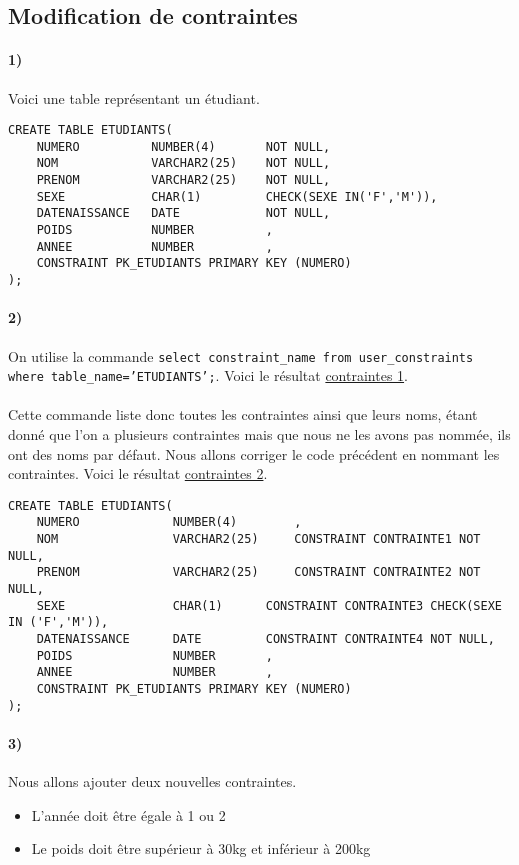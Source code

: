 \documentclass{report}
\begin{document}
\subsection{Modification de contraintes}

\paragraph{1)}Voici une table représentant un étudiant.

\begin{lstlisting}
CREATE TABLE ETUDIANTS(
    NUMERO          NUMBER(4)       NOT NULL,
    NOM             VARCHAR2(25)    NOT NULL,
    PRENOM          VARCHAR2(25)    NOT NULL,
    SEXE            CHAR(1)         CHECK(SEXE IN('F','M')),
    DATENAISSANCE   DATE            NOT NULL,
    POIDS           NUMBER          ,
    ANNEE           NUMBER          ,
    CONSTRAINT PK_ETUDIANTS PRIMARY KEY (NUMERO)
);
\end{lstlisting}

\paragraph{2)}On utilise la commande {\tt select constraint\_name from user\_constraints where table\_name='ETUDIANTS';}.
Voici le résultat \href{run:./Images/TP2/tp2_contrainte1.png}{contraintes 1}.

\paragraph{}Cette commande liste donc toutes les contraintes ainsi que leurs noms, étant donné que l'on a plusieurs contraintes mais que nous ne les avons pas nommée, ils ont des noms par défaut. Nous allons corriger le code précédent en nommant les contraintes. Voici le résultat \href{run:./Images/TP2/tp2_contrainte2.png}{contraintes 2}.

\begin{lstlisting}
CREATE TABLE ETUDIANTS(
	NUMERO             NUMBER(4)		,
	NOM                VARCHAR2(25)		CONSTRAINT CONTRAINTE1 NOT NULL,
	PRENOM             VARCHAR2(25)		CONSTRAINT CONTRAINTE2 NOT NULL,
	SEXE               CHAR(1)		CONSTRAINT CONTRAINTE3 CHECK(SEXE IN ('F','M')),
	DATENAISSANCE      DATE			CONSTRAINT CONTRAINTE4 NOT NULL,
	POIDS              NUMBER		,
	ANNEE              NUMBER		,
	CONSTRAINT PK_ETUDIANTS PRIMARY KEY (NUMERO)
);
\end{lstlisting}

\paragraph{3)}Nous allons ajouter deux nouvelles contraintes.
\begin{itemize}
	\item L'année doit être égale à 1 ou 2
	\item Le poids doit être supérieur à 30kg et inférieur à 200kg
\end{itemize}
\end{document}
